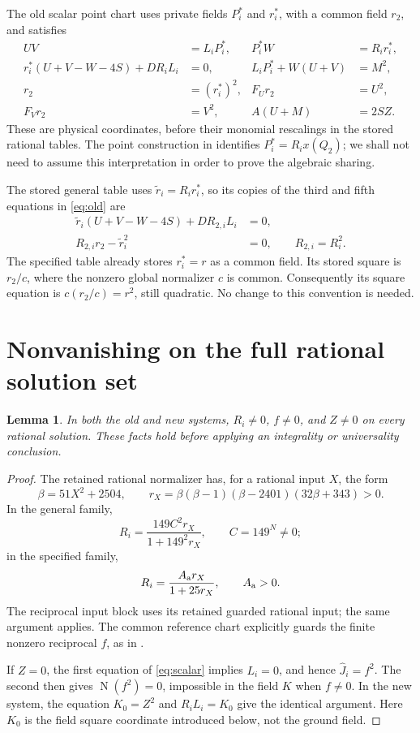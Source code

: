 \documentclass[11pt]{article}
\newtheorem{lemma}[theorem]{Lemma}
\theoremstyle{remark}\newtheorem{remark}[theorem]{Remark}
\newcommand{\Nm}{\operatorname{N}}
\begin{document}
The old scalar point chart uses private fields \(P_i^*\) and
\(r_i^*\), with a common field \(r_2\), and satisfies
\begin{equation}\label{eq:old}
\begin{aligned}
 UV&=L_iP_i^*,& P_i^*W&=R_i r_i^*,\\
 r_i^*(U+V-W-4S)+DR_iL_i&=0,&
 L_iP_i^*+W(U+V)&=M^2,\\
 r_2&=(r_i^*)^2,& F_Ur_2&=U^2,\\
 F_Vr_2&=V^2,& A(U+M)&=2SZ.
\end{aligned}
\end{equation}
These are physical coordinates, before their monomial rescalings in
the stored rational tables. The point construction in \cite{scalar}
identifies \(P_i^*=R_i x(Q_2)\); we shall not need to assume this
interpretation in order to prove the algebraic sharing.

The stored general table uses \(\widetilde r_i=R_i r_i^*\), so its
copies of the third and fifth equations in \eqref{eq:old} are
\begin{equation}\label{eq:stored-r}
\begin{aligned}
 \widetilde r_i(U+V-W-4S)+D R_{2,i}L_i&=0,\\
 R_{2,i}r_2-\widetilde r_i^2&=0,
 \qquad R_{2,i}=R_i^2.
\end{aligned}
\end{equation}
The specified table already stores \(r_i^*=r\) as a common field.
Its stored square is \(r_2/c\), where the nonzero global normalizer
\(c\) is common. Consequently its square equation is
\(c(r_2/c)=r^2\), still quadratic. No change to this convention
is needed.

\section{Nonvanishing on the full rational solution set}

\begin{lemma}\label{lem:nonzero}
In both the old and new systems, \(R_i\ne0\), \(f\ne0\), and
\(Z\ne0\) on every rational solution. These facts hold before
applying an integrality or universality conclusion.
\end{lemma}
\begin{proof}
The retained rational normalizer has, for a rational input \(X\),
the form
\[
 \beta=51X^2+2504,\qquad
 r_X=\beta(\beta-1)(\beta-2401)(32\beta+343)>0.
\]
In the general family,
\[
 R_i=\frac{149C^2r_X}{1+149^2r_X},\qquad C=149^N\ne0;
\]
in the specified family,
\[
 R_i=\frac{A_{\rm a}r_X}{1+25r_X},\qquad A_{\rm a}>0.
\]
The reciprocal input block uses its retained guarded rational input;
the same argument applies. The common reference chart explicitly
guards the finite nonzero reciprocal \(f\), as in
\cite{scalar,global}.

If \(Z=0\), the first equation of \eqref{eq:scalar} implies
\(L_i=0\), and hence \(\widehat J_i=f^2\). The second then gives
\(\Nm(f^2)=0\), impossible in the field \(K\) when \(f\ne0\).
In the new system, the equation \(K_0=Z^2\) and
\(R_iL_i=K_0\) give the identical argument. Here \(K_0\) is the
field square coordinate introduced below, not the ground field.
\end{proof}
\end{document}
